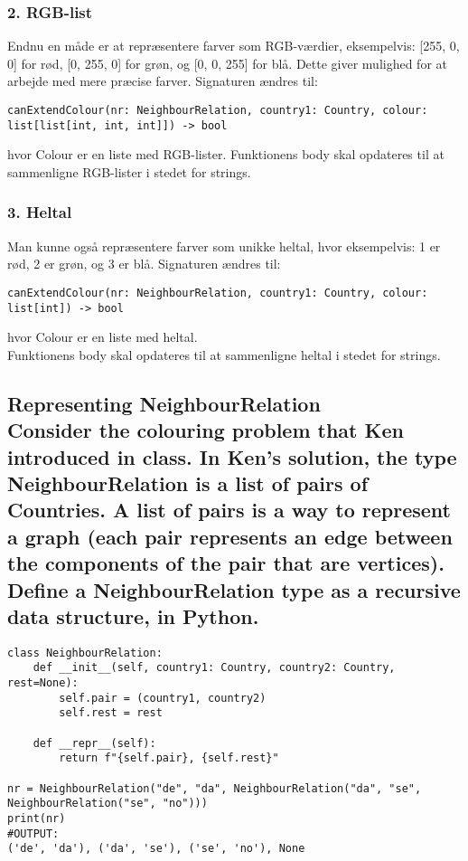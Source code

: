 \documentclass[a4paper,12pt]{article}
\begin{document}
\subsubsection*{2. RGB-list}
Endnu en måde er at repræsentere farver som RGB-værdier, eksempelvis: [255, 0, 0] for rød, [0, 255, 0] for grøn, og [0, 0, 255] for blå. Dette giver mulighed for at arbejde med mere præcise farver.
Signaturen ændres til:
\begin{lstlisting}
canExtendColour(nr: NeighbourRelation, country1: Country, colour: list[list[int, int, int]]) -> bool
\end{lstlisting}
hvor Colour er en liste med RGB-lister.
Funktionens body skal opdateres til at sammenligne RGB-lister i stedet for strings.

\subsubsection*{3. Heltal}
Man kunne også repræsentere farver som unikke heltal, hvor eksempelvis: 1 er rød, 2 er grøn, og 3 er blå.
Signaturen ændres til:
\begin{lstlisting}
canExtendColour(nr: NeighbourRelation, country1: Country, colour: list[int]) -> bool
\end{lstlisting}
hvor Colour er en liste med heltal.\\
Funktionens body skal opdateres til at sammenligne heltal i stedet for strings.

\subsection[Representing NeighbourRelation]{Representing NeighbourRelation\\
Consider the colouring problem that Ken introduced in class.
In Ken's solution, the type NeighbourRelation is a list of pairs of Countries.
A list of pairs is a way to represent a graph (each pair represents an edge between the components of the pair that are vertices).
Define a NeighbourRelation type as a recursive data structure, in Python.}

\begin{lstlisting}
class NeighbourRelation:
    def __init__(self, country1: Country, country2: Country, rest=None):
        self.pair = (country1, country2)
        self.rest = rest

    def __repr__(self):
        return f"{self.pair}, {self.rest}"
    
nr = NeighbourRelation("de", "da", NeighbourRelation("da", "se", NeighbourRelation("se", "no")))
print(nr)
#OUTPUT:
('de', 'da'), ('da', 'se'), ('se', 'no'), None
\end{lstlisting}
\end{document}
